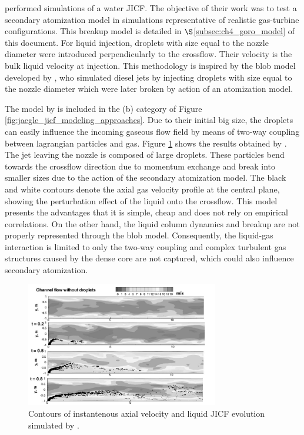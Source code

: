  performed simulations of a water JICF. The objective of their work was to test a secondary atomization model in simulations representative of realistic gas-turbine configurations. This breakup model is detailed in $\S$\ref{subsec:ch4_goro_model} of this document. For liquid injection, droplets with size equal to the nozzle diameter were introduced perpendicularly to the crossflow. Their velocity is the bulk liquid velocity at injection. This methodology is inspired by the blob model developed by , who simulated diesel jets by injecting droplets with size equal to the nozzle diameter which were later broken by action of an atomization model. 

The model by  is included in the (b) category of Figure \ref{fig:jaegle_jicf_modeling_approaches}. Due to their initial big size, the droplets can easily influence the incoming gaseous flow field by means of two-way coupling between lagrangian particles and gas. Figure \ref{fig:apte_2003_jicf} shows the results obtained by . The jet leaving the nozzle is composed of large droplets. These particles bend towards the crossflow direction due to momentum exchange and break into smaller sizes due to the action of the secondary atomization model. The black and white contours denote the axial gas velocity profile at the central plane, showing the perturbation effect of the liquid onto the crossflow. This model presents the advantages that it is simple, cheap and does not rely on empirical correlations. On the other hand, the liquid column dynamics and breakup are not properly represented through the blob model. Consequently, the liquid-gas interaction is limited to only the two-way coupling and complex turbulent gas structures caused by the dense core are not captured, which could also influence secondary atomization.

\begin{figure}[ht]
    \centering
    \includegraphics[width=0.75\textwidth]{./part1_numerical_approaches/figures_ch3/apte_2003_jicf}
       \centering
    \caption{Contours of instantenous axial velocity and liquid JICF evolution simulated by .}
    \label{fig:apte_2003_jicf}
\end{figure}


